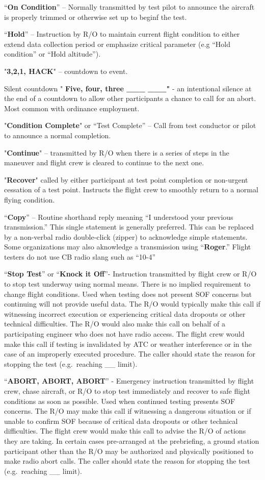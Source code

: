 \documentclass[
]{book}
\begin{document}
``\textbf{On Condition}'' -- Normally transmitted by test pilot to announce the
aircraft is properly trimmed or otherwise set up to beginf the test.

``\textbf{Hold}'' -- Instruction by R/O to maintain current flight condition to either
extend data collection period or emphasize critical parameter (e.g ``Hold
condition'' or ``Hold altitude'').

"\textbf{3,2,1, HACK}" -- countdown to event.

Silent countdown " \textbf{Five, four, three \_\_\_ \_\_\_"} - an intentional silence
at the end of a countdown to allow other participants a chance to call for an
abort. Most common with ordinance employment.

"\textbf{Condition Complete}" or ``Test Complete'' -- Call from test conductor or
pilot to announce a normal completion.

"\textbf{Continue}" -- transmitted by R/O when there is a series of steps in the
maneuver and flight crew is cleared to continue to the next one.~~

"\textbf{Recover}" called by either participant at test point completion or
non-urgent cessation of a test point. Instructs the flight crew to smoothly
return to a normal flying condition.

``\textbf{Copy}'' -- Routine shorthand reply meaning ``I understood your previous
transmission.'' This single statement is generally preferred. This can be
replaced by a non-verbal radio double-click (zipper) to acknowledge simple
statements. Some organizations may also aknowledge a transmission using
``\textbf{Roger}.'' Flight testers do not use CB radio slang such as ``10-4''

``\textbf{Stop Test}'' or ``\textbf{Knock it Off}''- Instruction transmitted by flight crew or
R/O to stop test underway using normal means. There is no implied requirement to
change flight conditions. Used when testing does not present SOF concerns but
continuing will not provide useful data. The R/O would typically make this call
if witnessing incorrect execution or experiencing critical data dropouts or
other technical difficulties. The R/O would also make this call on behalf of a
participating engineer who does not have radio access. The flight crew would
make this call if testing is invalidated by ATC or weather interference or in
the case of an improperly executed procedure. The caller should state the reason
for stopping the test (e.g.~reaching \_\_ limit).

``\textbf{ABORT, ABORT, ABORT}'' - Emergency instruction transmitted by flight crew,
chase aircraft, or R/O to stop test immediately and recover to safe flight
conditions as soon as possible. Used when continued testing presents SOF
concerns. The R/O may make this call if witnessing a dangerous situation or if
unable to confirm SOF because of critical data dropouts or other technical
difficulties. The flight crew would make this call to advise the R/O of actions
they are taking. In certain cases pre-arranged at the prebriefing, a ground
station participant other than the R/O may be authorized and physically
positioned to make radio abort calls. The caller should state the reason for
stopping the test (e.g.~reaching \_\_ limit).
\end{document}

